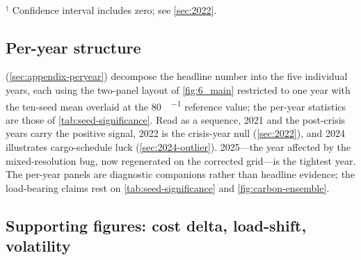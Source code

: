 \documentclass[11pt]{article}
\begin{document}
\begin{table}[h]
  \centering
  \caption{Seed sensitivity at \SI{80}{\EUR\per\tCOtwo}: per-year and
    $t$-tests on the null that composition-aware dispatch saves nothing
    against the lagged-composition baseline. Per-year rows use $n=10$
    cargo-schedule seeds. The five-year aggregate first averages each seed's
    five yearly saving percentages, then tests the resulting 10 seed-level
    means; the years are price regimes, not independent draws. SE is the
    standard error of the mean; 95\% CI is a Student's $t$ interval; $p$ is
    two-sided, with values below $10^{-4}$ reported as order-of-magnitude
    thresholds. The tabular is generated from
    \texttt{results/tables/seed\_significance\_hard\_co280.csv} by
    \texttt{scripts/09\_paper\_numbers.py}; a two-sided Wilcoxon signed-rank
    column appears when the regenerated artifacts carry it.}
  \label{tab:seed-significance}
   \\[2pt]
  {\footnotesize $^{\dagger}$ Confidence interval includes zero; see \cref{sec:2022}.}
\end{table}

\subsection{Per-year structure}
\label{sec:per-year}

(\cref{sec:appendix-peryear}) decompose the headline number into the five
individual years, each using the two-panel layout of \cref{fig:6_main}
restricted to one year with the ten-seed mean overlaid at the
\SI{80}{\EUR\per\tCOtwo} reference value; the per-year statistics are those of
\cref{tab:seed-significance}. Read as a sequence, 2021 and the post-crisis
years carry the positive signal, 2022 is the crisis-year null
(\cref{sec:2022}), and 2024 illustrates cargo-schedule luck
(\cref{sec:2024-outlier}). 2025---the year affected by the mixed-resolution
bug, now regenerated on the corrected grid---is the tightest year. The
per-year panels are diagnostic companions rather than headline evidence; the
load-bearing claims rest on \cref{tab:seed-significance} and
\cref{fig:carbon-ensemble}.

\subsection{Supporting figures: cost delta, load-shift, volatility}
\label{sec:supporting}
\end{document}
